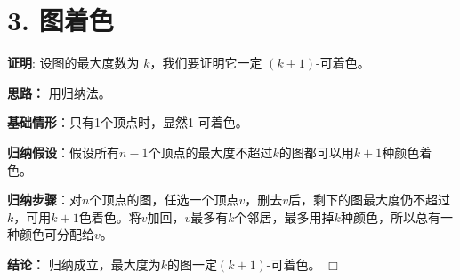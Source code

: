 \documentclass[11pt]{article}
\def\endproofmark{$\Box$}
\newenvironment{proof}{\par{\bf 证明}:}{\endproofmark\smallskip}
\begin{document}

\section*{3. 图着色}
\begin{proof}
设图的最大度数为 $k$，我们要证明它一定 $(k+1)$-可着色。

\textbf{思路：} 用归纳法。

\textbf{基础情形}：只有1个顶点时，显然1-可着色。

\textbf{归纳假设}：假设所有$n-1$个顶点的最大度不超过$k$的图都可以用$k+1$种颜色着色。

\textbf{归纳步骤}：对$n$个顶点的图，任选一个顶点$v$，删去$v$后，剩下的图最大度仍不超过$k$，可用$k+1$色着色。将$v$加回，$v$最多有$k$个邻居，最多用掉$k$种颜色，所以总有一种颜色可分配给$v$。

\textbf{结论：} 归纳成立，最大度为$k$的图一定$(k+1)$-可着色。
\end{proof}

\end{document}
